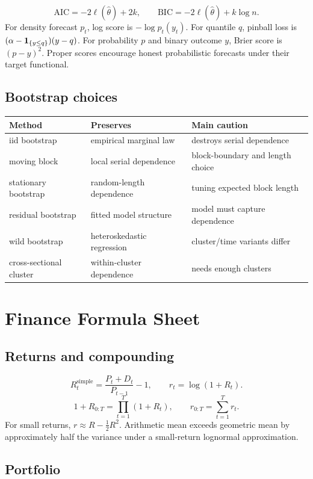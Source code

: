 \[
\mathrm{AIC}=-2\ell(\widehat\theta)+2k,\qquad
\mathrm{BIC}=-2\ell(\widehat\theta)+k\log n.
\]
For density forecast $p_t$, log score is $-\log p_t(y_t)$. For quantile $q$,
pinball loss is $(\alpha-\mathbf 1_{\{y\leq q\}})(y-q)$. For probability $p$ and binary
outcome $y$, Brier score is $(p-y)^2$. Proper scores encourage honest probabilistic
forecasts under their target functional.

\section{Bootstrap choices}

\begin{longtable}{p{}p{}p{}}
\toprule
Method & Preserves & Main caution\\
\midrule
iid bootstrap & empirical marginal law & destroys serial dependence\\
moving block & local serial dependence & block-boundary and length choice\\
stationary bootstrap & random-length dependence & tuning expected block length\\
residual bootstrap & fitted model structure & model must capture dependence\\
wild bootstrap & heteroskedastic regression & cluster/time variants differ\\
cross-sectional cluster & within-cluster dependence & needs enough clusters\\
\bottomrule
\end{longtable}


\chapter{Finance Formula Sheet}

\section{Returns and compounding}

\[
R_{t}^{\mathrm{simple}}=\frac{P_t+D_t}{P_{t-1}}-1,\qquad
r_t=\log(1+R_t).
\]
\[
1+R_{0:T}=\prod_{t=1}^T(1+R_t),\qquad
r_{0:T}=\sum_{t=1}^Tr_t.
\]
For small returns, $r\approx R-\frac12R^2$. Arithmetic mean exceeds geometric mean
by approximately half the variance under a small-return lognormal approximation.

\section{Portfolio}

